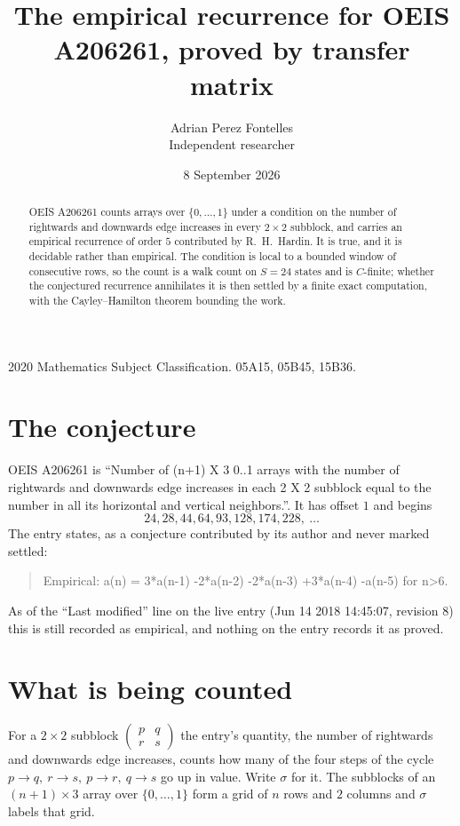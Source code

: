 \documentclass[11pt,a4paper]{article}
\title{The empirical recurrence for OEIS A206261, proved by transfer matrix}
\author{Adrian Perez Fontelles\\ \small Independent researcher}
\date{8 September 2026}
\theoremstyle{plain}
\theoremstyle{definition}
\begin{document}
\maketitle

\begin{abstract}
OEIS A206261 counts arrays over $\{0,\dots,1\}$ under a condition on the number of rightwards and downwards edge increases
in every $2\times2$ subblock, and carries an empirical recurrence of order $5$ contributed by
R.~H.~Hardin. It is true, and it is decidable rather than empirical. The condition is local to
a bounded window of consecutive rows, so the count is a walk count on $S=24$ states and is
$C$-finite; whether the conjectured recurrence annihilates it is then settled by a finite exact
computation, with the Cayley--Hamilton theorem bounding the work.
\end{abstract}

\noindent\small 2020 Mathematics Subject Classification. 05A15, 05B45, 15B36.\normalsize

\section{The conjecture}

OEIS A206261 is ``Number of (n+1) X 3 0..1 arrays with the number of rightwards and downwards edge increases in each 2 X 2 subblock equal to the number in all its horizontal and vertical neighbors.''. It has offset $1$ and begins
\[
24, 28, 44, 64, 93, 128, 174, 228,\ \dots
\]
The entry states, as a conjecture contributed by its author and never marked settled:
\begin{quote}
Empirical: a(n) = 3*a(n-1) -2*a(n-2) -2*a(n-3) +3*a(n-4) -a(n-5) for n>6.
\end{quote}
As of the ``Last modified'' line on the live entry (Jun 14 2018 14:45:07, revision 8) this is still
recorded as empirical, and nothing on the entry records it as proved.

\section{What is being counted}

For a $2\times2$ subblock $\begin{pmatrix}p&q\\r&s\end{pmatrix}$ the
entry's quantity, the number of rightwards and downwards edge increases, counts how many of the four steps of the cycle $p\to q,\ r\to s,\ p\to r,\ q\to s$ go up in value. Write $\sigma$ for it. The subblocks of an
$(n+1)\times3$ array over $\{0,\dots,1\}$ form a grid of $n$ rows and $2$
columns and $\sigma$ labels that grid.
\end{document}
